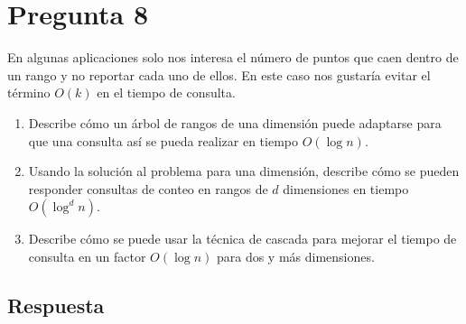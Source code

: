 \section*{Pregunta 8}
\noindent En algunas aplicaciones solo nos interesa el número de puntos que caen dentro de un rango y no reportar cada uno de ellos.
En este caso nos gustaría evitar el término $O(k)$ en el tiempo de consulta.

\begin{enumerate}
  \item Describe cómo un árbol de rangos de una dimensión puede adaptarse para que una consulta así se pueda realizar en tiempo $O(\log n)$.
  \item Usando la solución al problema para una dimensión, describe cómo se pueden responder consultas de conteo en rangos de $d$ dimensiones en tiempo $O(\log^d n)$.
  \item Describe cómo se puede usar la técnica de cascada para mejorar el tiempo de consulta en un factor $O(\log n)$ para dos y más dimensiones.
\end{enumerate}

\subsection*{Respuesta}

